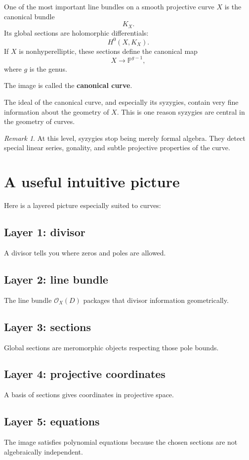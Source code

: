 \documentclass[11pt]{article}
\theoremstyle{definition}
\theoremstyle{remark}
\newtheorem{remark}[theorem]{Remark}
\newcommand{\PP}{\mathbb{P}}
\newcommand{\cO}{\mathcal{O}}
\begin{document}
	One of the most important line bundles on a smooth projective curve \(X\) is the canonical bundle
	\[
	K_X.
	\]
	Its global sections are holomorphic differentials:
	\[
	H^0(X,K_X).
	\]
	If \(X\) is nonhyperelliptic, these sections define the canonical map
	\[
	X\to \PP^{g-1},
	\]
	where \(g\) is the genus.
	
	The image is called the \textbf{canonical curve}.
	
	The ideal of the canonical curve, and especially its syzygies, contain very fine information about the geometry of \(X\). This is one reason syzygies are central in the geometry of curves.
	
	\begin{remark}
		At this level, syzygies stop being merely formal algebra. They detect special linear series, gonality, and subtle projective properties of the curve.
	\end{remark}
	
	\section{A useful intuitive picture}
	
	Here is a layered picture especially suited to curves:
	
	\subsection*{Layer 1: divisor}
	A divisor tells you where zeros and poles are allowed.
	
	\subsection*{Layer 2: line bundle}
	The line bundle \(\cO_X(D)\) packages that divisor information geometrically.
	
	\subsection*{Layer 3: sections}
	Global sections are meromorphic objects respecting those pole bounds.
	
	\subsection*{Layer 4: projective coordinates}
	A basis of sections gives coordinates in projective space.
	
	\subsection*{Layer 5: equations}
	The image satisfies polynomial equations because the chosen sections are not algebraically independent.
	
\end{document}
